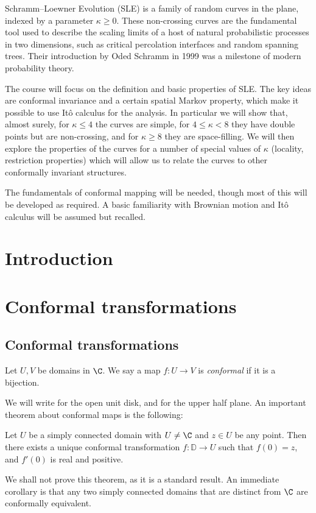 \documentclass[a4paper]{article}
\renewcommand\D{\mathbb{D}}
\begin{document}
\maketitle
{\small
\setlength{\parindent}{0em}
\setlength{\parskip}{1em}
Schramm--Loewner Evolution (SLE) is a family of random curves in the plane, indexed by a parameter $\kappa \geq 0$. These non-crossing curves are the fundamental tool used to describe the scaling limits of a host of natural probabilistic processes in two dimensions, such as critical percolation interfaces and random spanning trees. Their introduction by Oded Schramm in 1999 was a milestone of modern probability theory.

The course will focus on the definition and basic properties of SLE. The key ideas are conformal invariance and a certain spatial Markov property, which make it possible to use It\^o calculus for the analysis. In particular we will show that, almost surely, for $\kappa \leq 4$ the curves are simple, for $4 \leq \kappa < 8$ they have double points but are non-crossing, and for $\kappa \geq 8$ they are space-filling. We will then explore the properties of the curves for a number of special values of $\kappa$ (locality, restriction properties) which will allow us to relate the curves to other conformally invariant structures.

The fundamentals of conformal mapping will be needed, though most of this will be developed as required. A basic familiarity with Brownian motion and It\^o calculus will be assumed but recalled.
}
\tableofcontents

\section{Introduction}
\section{Conformal transformations}
\subsection{Conformal transformations}
\begin{defi}
  Let $U, V$ be domains in $\C$. We say a map $f: U \to V$ is \emph{conformal} if it is a bijection.
\end{defi}

We will write \term{$\D$} for the open unit disk, and \term{$\H$} for the upper half plane. An important theorem about conformal maps is the following:
\begin{thm}
  Let $U$ be a simply connected domain with $U \not= \C$ and $z \in U$ be any point. Then there exists a unique conformal transformation $f: \D \to U$ such that $f(0) = z$, and $f'(0)$ is real and positive.
\end{thm}
We shall not prove this theorem, as it is a standard result. An immediate corollary is that any two simply connected domains that are distinct from $\C$ are conformally equivalent.
\end{document}

